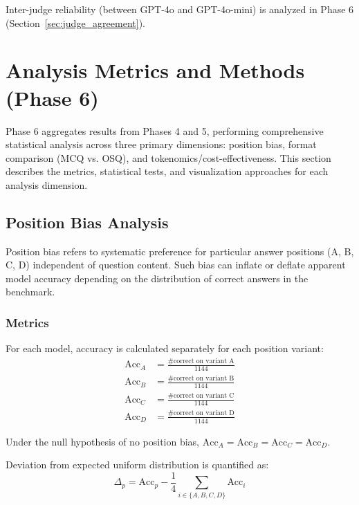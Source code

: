 Inter-judge reliability (between GPT-4o and GPT-4o-mini) is analyzed in Phase 6 (Section~\ref{sec:judge_agreement}).

\section{Analysis Metrics and Methods (Phase 6)}\label{sec:analysis_metrics_methods}

Phase 6 aggregates results from Phases 4 and 5, performing comprehensive statistical analysis across three primary dimensions: position bias, format comparison (MCQ vs. OSQ), and tokenomics/cost-effectiveness. This section describes the metrics, statistical tests, and visualization approaches for each analysis dimension.

\subsection{Position Bias Analysis}\label{sec:position_bias_analysis}

Position bias refers to systematic preference for particular answer positions (A, B, C, D) independent of question content. Such bias can inflate or deflate apparent model accuracy depending on the distribution of correct answers in the benchmark.

\subsubsection{Metrics}

For each model, accuracy is calculated separately for each position variant:
\begin{align}
\text{Acc}_A &= \frac{\text{\# correct on variant A}}{1144} \\
\text{Acc}_B &= \frac{\text{\# correct on variant B}}{1144} \\
\text{Acc}_C &= \frac{\text{\# correct on variant C}}{1144} \\
\text{Acc}_D &= \frac{\text{\# correct on variant D}}{1144}
\end{align}

Under the null hypothesis of no position bias, $\text{Acc}_A = \text{Acc}_B = \text{Acc}_C = \text{Acc}_D$.

Deviation from expected uniform distribution is quantified as:
\begin{equation}
\Delta_p = \text{Acc}_p - \frac{1}{4}\sum_{i \in \{A,B,C,D\}} \text{Acc}_i
\end{equation}

